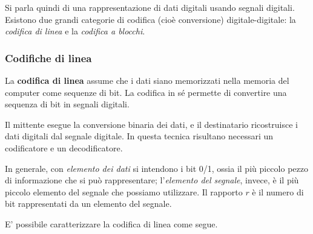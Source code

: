         Si parla quindi di una rappresentazione di dati digitali usando segnali digitali. Esistono due grandi categorie di codifica (cioè conversione) digitale-digitale: la \textit{codifica di linea} e la \textit{codifica a blocchi}.
    
        \subsubsection{Codifiche di linea}
        
            La \textbf{codifica di linea} assume che i dati siano memorizzati nella memoria del computer come sequenze di bit. La codifica in sé permette di convertire una sequenza di bit in segnali digitali.
            
            Il mittente esegue la conversione binaria dei dati, e il destinatario ricostruisce i dati digitali dal segnale digitale. In questa tecnica risultano necessari un codificatore e un decodificatore. 
            
            \vspace{3mm}
            
            In generale, con \textit{elemento dei dati} si intendono i bit 0/1, ossia il più piccolo pezzo di informazione che si può rappresentare; l'\textit{elemento del segnale}, invece, è il più piccolo elemento del segnale che possiamo utilizzare. Il rapporto $r$ è il numero di bit rappresentati da un elemento del segnale.
            
            \vspace{3mm}
            
            E' possibile caratterizzare la codifica di linea come segue.
            
